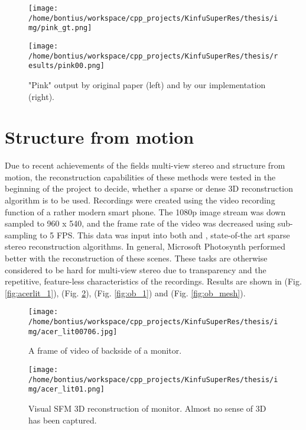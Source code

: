 \documentclass{ucl_thesis}
\newcommand{\figref}[1]{(Fig. \ref{#1})}
\begin{document}
\begin{figure}[h!]\centering
	\begin{minipage}[b]{0.49\linewidth}\centering
		\texttt{[image: /home/bontius/workspace/cpp\_projects/KinfuSuperRes/thesis/img/pink\_gt.png]}
	\end{minipage}
	\begin{minipage}[b]{0.49\linewidth}\centering
		\texttt{[image: /home/bontius/workspace/cpp\_projects/KinfuSuperRes/thesis/results/pink00.png]}
	\end{minipage}
	\caption{"Pink" output by original paper (left) and by our implementation (right).}
	\label{fig:pink}
\end{figure}


\section{Structure from motion} 
\label{sec:sfm}

\par Due to recent achievements of the fields multi-view stereo and structure from motion, the reconstruction capabilities of these methods were tested in the beginning of the project to decide, whether a sparse or dense 3D reconstruction algorithm is to be used. Recordings were created using the video recording function of a rather modern smart phone. The 1080p image stream was down sampled to 960 x 540, and the frame rate of the video was decreased using sub-sampling to 5 FPS. This data was input into both \citep{Photosynth} and \citep{vsfm}, state-of-the art sparse stereo reconstruction algorithms. In general, Microsoft Photosynth performed better with the reconstruction of these scenes. These tasks are otherwise considered to be hard for multi-view stereo due to transparency and the repetitive, feature-less characteristics of the recordings. Results are shown in \figref{fig:acerlit_1}, \figref{fig:acerlit_mesh}, \figref{fig:ob_1} and \figref{fig:ob_mesh}.

\begin{figure}[h!]\centering
	\begin{minipage}[b]{0.4\linewidth}\centering
		\texttt{[image: /home/bontius/workspace/cpp\_projects/KinfuSuperRes/thesis/img/acer\_lit00706.jpg]}
		\caption{A frame of video of backside of a monitor.}
		\label{fig:acerlit_1}
	\end{minipage}
	\begin{minipage}[b]{0.49\linewidth}\centering
		\texttt{[image: /home/bontius/workspace/cpp\_projects/KinfuSuperRes/thesis/img/acer\_lit01.png]}
		\caption{Visual SFM 3D reconstruction of monitor. Almost no sense of 3D has been captured.}
		\label{fig:acerlit_mesh}
	\end{minipage}
\end{figure}
\end{document}
